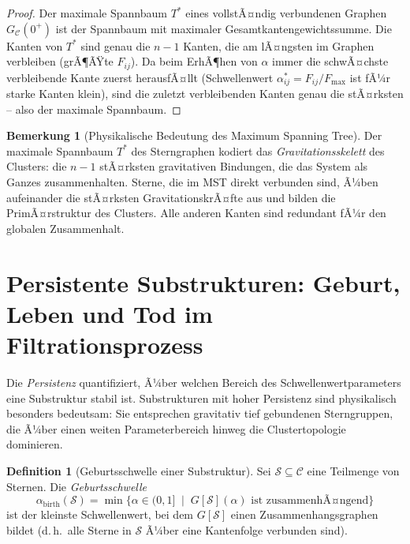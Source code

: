 ﻿\documentclass[a4paper,12pt]{report}
\theoremstyle{definition}
\newtheorem{definition}{Definition}
\newtheorem{bemerkung}{Bemerkung}
\begin{document}
\begin{proof}
Der maximale Spannbaum $T^*$ eines vollstÃ¤ndig verbundenen Graphen $G_\mathcal{C}(0^+)$ ist der Spannbaum mit maximaler Gesamtkantengewichtssumme. Die Kanten von $T^*$ sind genau die $n-1$ Kanten, die am lÃ¤ngsten im Graphen verbleiben (grÃ¶ÃŸte $F_{ij}$). Da beim ErhÃ¶hen von $\alpha$ immer die schwÃ¤chste verbleibende Kante zuerst herausfÃ¤llt (Schwellenwert $\alpha^*_{ij} = F_{ij}/F_\mathrm{max}$ ist fÃ¼r starke Kanten klein), sind die zuletzt verbleibenden Kanten genau die stÃ¤rksten -- also der maximale Spannbaum.
\end{proof}

\begin{bemerkung}[Physikalische Bedeutung des Maximum Spanning Tree]
Der maximale Spannbaum $T^*$ des Sterngraphen kodiert das \emph{Gravitationsskelett} des Clusters: die $n-1$ stÃ¤rksten gravitativen Bindungen, die das System als Ganzes zusammenhalten. Sterne, die im MST direkt verbunden sind, Ã¼ben aufeinander die stÃ¤rksten GravitationskrÃ¤fte aus und bilden die PrimÃ¤rstruktur des Clusters. Alle anderen Kanten sind redundant fÃ¼r den globalen Zusammenhalt.
\end{bemerkung}

\section{Persistente Substrukturen: Geburt, Leben und Tod im Filtrationsprozess}
\label{sec:persistenz}

Die \emph{Persistenz} quantifiziert, Ã¼ber welchen Bereich des Schwellenwertparameters eine Substruktur stabil ist. Substrukturen mit hoher Persistenz sind physikalisch besonders bedeutsam: Sie entsprechen gravitativ tief gebundenen Sterngruppen, die Ã¼ber einen weiten Parameterbereich hinweg die Clustertopologie dominieren.

\begin{definition}[Geburtsschwelle einer Substruktur]
\label{def:geburt}
Sei $\mathcal{S} \subseteq \mathcal{C}$ eine Teilmenge von Sternen. Die \emph{Geburtsschwelle}
\[
\alpha_\mathrm{birth}(\mathcal{S}) = \min\bigl\{\alpha \in (0,1] \;\mid\; G[\mathcal{S}](\alpha) \text{ ist zusammenhÃ¤ngend}\bigr\}
\]
ist der kleinste Schwellenwert, bei dem $G[\mathcal{S}]$ einen Zusammenhangs\-graphen bildet (d.\,h.\ alle Sterne in $\mathcal{S}$ Ã¼ber eine Kantenfolge verbunden sind).
\end{definition}
\end{document}
